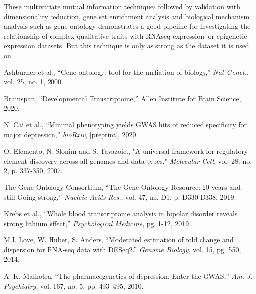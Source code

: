 \documentclass{bioinfo}
\begin{document}
These multivariate mutual information techniques followed by validation with dimensionality reduction, gene set enrichment analysis and biological mechanism analysis such as gene ontology demonstrates a good pipeline for investigating the relationship of complex qualitative traits with RNAseq expression, or epigenetic expression datasets. But this technique is only as strong as the dataset it is used on.


\clearpage

%
%
%
%
%
%
%
%
%


\begin{thebibliography}{}


Ashburner et al., “Gene ontology: tool for the unifiation of biology,” {\it Nat Genet.}, vol. 25,  no. 1, 2000.

Brainspan, “Developmental Transcriptome,” Allen Institute for Brain Science, 2020.

N. Cai et al., “Minimal phenotyping yields GWAS hits of reduced specificity for major depression,” {\it bioRxiv}, [preprint], 2020.

O. Elemento, N. Slonim and S. Tavazoie., "A universal framework for regulatory element discovery across all genomes and data types," {\it Molecular Cell}, vol. 28. no. 2, p. 337-350, 2007.

The Gene Ontology Consortium, “The Gene Ontology Resource: 20 years and still Going strong,” {\it Nucleic Acids Res.}, vol. 47, no. D1, p. D330-D338, 2019.

Krebs et al., “Whole blood transcriptome analysis in bipolar disorder reveals strong lithium effect,” {\it Psychological Medicine}, pg. 1-12, 2019.

M.I. Love, W. Huber, S. Anders, “Moderated estimation of fold change and dispersion for RNA-seq data with DESeq2.” {\it Genome Biology}, vol. 15, pg. 550, 2014.

A. K. Malhotra, “The pharmacogenetics of depression: Enter the GWAS,” {\it Am. J. Psychiatry}, vol. 167, no. 5, pp. 493–495, 2010.


\end{thebibliography}
\end{document}
